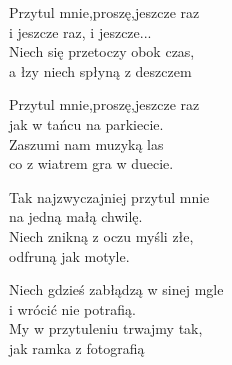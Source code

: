 \begin{text}
    Przytul mnie,proszę,jeszcze raz\\
    i jeszcze raz, i jeszcze...\\
    Niech się przetoczy obok czas,\\
    a łzy niech spłyną z deszczem

    Przytul mnie,proszę,jeszcze raz\\
    jak w tańcu na parkiecie.\\
    Zaszumi nam muzyką las\\
    co z wiatrem gra w duecie.

    Tak najzwyczajniej przytul mnie\\
    na jedną małą chwilę.\\
    Niech znikną z oczu myśli złe,\\
    odfruną jak motyle.

    Niech gdzieś zabłądzą w sinej mgle\\
    i wrócić nie potrafią.\\
    My w przytuleniu trwajmy tak,\\
    jak ramka z fotografią
\end{text}
\begin{chord}
\end{chord}